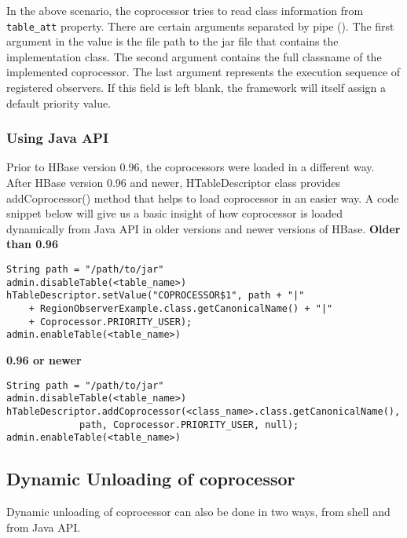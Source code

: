 \documentclass[11pt,a4paper,bibtotoc,idxtotoc,headsepline,footsepline,footexclude,BCOR12mm,DIV13]{scrbook}
\begin{document}
In the above scenario, the coprocessor tries to read class information from \texttt{table\_att} property. There are certain arguments separated by pipe (\text{\textbar}). The first argument in the value is the file path to the jar file that contains the implementation class. The second argument contains the full classname of the implemented coprocessor. The last argument represents the execution sequence of registered observers. If this field is left blank, the framework will itself assign a default priority value\cite{hbase:site}.

\subsubsection{Using Java API}
Prior to HBase version 0.96, the coprocessors were loaded in a different way. After HBase version 0.96 and newer, HTableDescriptor class provides addCoprocessor() method that helps to load coprocessor in an easier way. A code snippet\cite{loading:coprocessors} below will give us a basic insight of how coprocessor is loaded dynamically from Java API in older versions and newer versions of HBase.
\newline \newline
\textbf{Older than 0.96} \newline
\lstset{language=Java}
\begin{lstlisting}
String path = "/path/to/jar"
admin.disableTable(<table_name>)
hTableDescriptor.setValue("COPROCESSOR$1", path + "|"
    + RegionObserverExample.class.getCanonicalName() + "|"
    + Coprocessor.PRIORITY_USER);
admin.enableTable(<table_name>)
\end{lstlisting}

\textbf{0.96 or newer} \newline
\lstset{language=Java}
\begin{lstlisting}
String path = "/path/to/jar"
admin.disableTable(<table_name>)
hTableDescriptor.addCoprocessor(<class_name>.class.getCanonicalName(),
             path, Coprocessor.PRIORITY_USER, null);
admin.enableTable(<table_name>)
\end{lstlisting}

\subsection{Dynamic Unloading of coprocessor}
Dynamic unloading of coprocessor can also be done in two ways, from shell and from Java API. 
\end{document}
